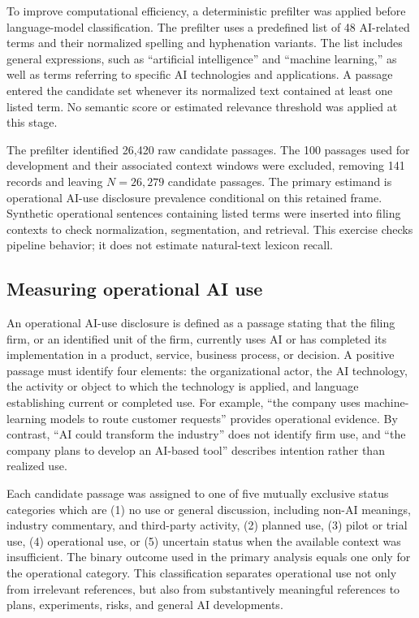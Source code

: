 \documentclass[12pt]{article}
\begin{document}
To improve computational efficiency, a deterministic prefilter was applied
before language-model classification. The prefilter uses a predefined list of
48 AI-related terms and their normalized spelling and hyphenation variants.
The list includes general expressions, such as ``artificial intelligence''
and ``machine learning,'' as well as terms referring to specific AI
technologies and applications. A passage entered the candidate set whenever
its normalized text contained at least one listed term. No semantic score or
estimated relevance threshold was applied at this stage.

The prefilter identified 26,420 raw candidate passages. The 100 passages used
for development and their associated context windows were excluded, removing
141 records and leaving $N=26{,}279$ candidate passages. The primary estimand
is operational AI-use disclosure prevalence conditional on this retained
frame. Synthetic operational sentences containing listed terms were inserted
into filing contexts to check normalization, segmentation, and retrieval.
This exercise checks pipeline behavior; it does not estimate natural-text
lexicon recall.

\subsection{Measuring operational AI use}
\label{sec:construct}

An operational AI-use disclosure is defined as a passage stating that
the filing firm, or an identified unit of the firm, currently uses AI or has
completed its implementation in a product, service, business process, or
decision. A positive passage must identify four elements: the organizational
actor, the AI technology, the activity or object to which the technology is
applied, and language establishing current or completed use. For example,
``the company uses machine-learning models to route customer requests'' provides
operational evidence. By contrast, ``AI could transform the industry'' does
not identify firm use, and ``the company plans to develop an AI-based tool'' describes
intention rather than realized use.

Each candidate passage was assigned to one of five mutually exclusive status
categories which are (1) no use or general discussion, including non-AI meanings,
industry commentary, and third-party activity, (2) planned use, (3) pilot or
trial use, (4) operational use, or (5) uncertain status when the available
context was insufficient. The binary outcome used in the primary analysis
equals one only for the operational category. This classification separates
operational use not only from irrelevant references, but also from
substantively meaningful references to plans, experiments, risks, and general
AI developments.
\end{document}
